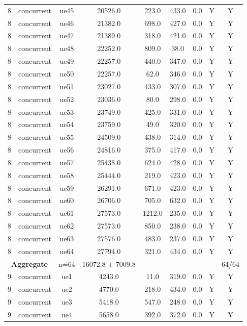 \begin{table}[ht]
\begin{tabular}{|c|c|c|c|c|c|c|c|c|}
8 & concurrent & ue45 & 20526.0 & 223.0 & 433.0 & 0.0 & Y & Y \\
8 & concurrent & ue46 & 21382.0 & 698.0 & 427.0 & 0.0 & Y & Y \\
8 & concurrent & ue47 & 21389.0 & 318.0 & 421.0 & 0.0 & Y & Y \\
8 & concurrent & ue48 & 22252.0 & 809.0 & 38.0 & 0.0 & Y & Y \\
8 & concurrent & ue49 & 22257.0 & 440.0 & 347.0 & 0.0 & Y & Y \\
8 & concurrent & ue50 & 22257.0 & 62.0 & 346.0 & 0.0 & Y & Y \\
8 & concurrent & ue51 & 23027.0 & 433.0 & 307.0 & 0.0 & Y & Y \\
8 & concurrent & ue52 & 23036.0 & 80.0 & 298.0 & 0.0 & Y & Y \\
8 & concurrent & ue53 & 23749.0 & 425.0 & 331.0 & 0.0 & Y & Y \\
8 & concurrent & ue54 & 23759.0 & 49.0 & 320.0 & 0.0 & Y & Y \\
8 & concurrent & ue55 & 24509.0 & 438.0 & 314.0 & 0.0 & Y & Y \\
8 & concurrent & ue56 & 24816.0 & 375.0 & 417.0 & 0.0 & Y & Y \\
8 & concurrent & ue57 & 25438.0 & 624.0 & 428.0 & 0.0 & Y & Y \\
8 & concurrent & ue58 & 25444.0 & 219.0 & 423.0 & 0.0 & Y & Y \\
8 & concurrent & ue59 & 26291.0 & 671.0 & 423.0 & 0.0 & Y & Y \\
8 & concurrent & ue60 & 26706.0 & 705.0 & 632.0 & 0.0 & Y & Y \\
8 & concurrent & ue61 & 27573.0 & 1212.0 & 235.0 & 0.0 & Y & Y \\
8 & concurrent & ue62 & 27573.0 & 850.0 & 238.0 & 0.0 & Y & Y \\
8 & concurrent & ue63 & 27576.0 & 483.0 & 237.0 & 0.0 & Y & Y \\
8 & concurrent & ue64 & 27794.0 & 321.0 & 434.0 & 0.0 & Y & Y \\
\multicolumn{2}{|c|}{\textbf{Aggregate}} & n=64 & 16072.8 $\pm$ 7009.8 & -- & -- & -- & -- & 64/64 \\
\hline
9 & concurrent & ue1 & 4243.0 & 11.0 & 319.0 & 0.0 & Y & Y \\
9 & concurrent & ue2 & 4770.0 & 218.0 & 434.0 & 0.0 & Y & Y \\
9 & concurrent & ue3 & 5418.0 & 547.0 & 248.0 & 0.0 & Y & Y \\
9 & concurrent & ue4 & 5658.0 & 392.0 & 372.0 & 0.0 & Y & Y \\

\end{tabular}
\end{table}
